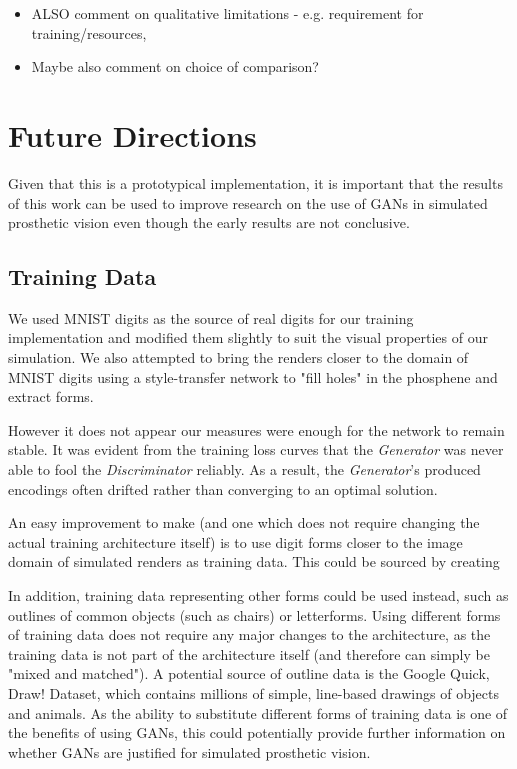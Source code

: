 \documentclass[a4paper,11pt,openany]{book}
\begin{document}
\begin{itemize}
\item ALSO comment on qualitative limitations - e.g. requirement for training/resources,
\item Maybe also comment on choice of comparison?
\end{itemize}

\chapter{Future Directions}
\label{sec:org9806fc4}

Given that this is a prototypical implementation, it is important that the results of this work can be used to improve research on the use of GANs in simulated prosthetic vision even though the early results are not conclusive.

\section*{Training Data}
\label{sec:org60bf5d4}

We used MNIST digits as the source of real digits for our training implementation and modified them slightly to suit the visual properties of our simulation.
We also attempted to bring the renders closer to the domain of MNIST digits using a style-transfer network to "fill holes" in the phosphene and extract forms.

However it does not appear our measures were enough for the network to remain stable.
It was evident from the training loss curves that the \emph{Generator} was never able to fool the \emph{Discriminator} reliably.
As a result, the \emph{Generator}'s produced encodings often drifted rather than converging to an optimal solution.

An easy improvement to make (and one which does not require changing the actual training architecture itself) is to use digit forms closer to the image domain of simulated renders as training data.
This could be sourced by creating

In addition, training data representing other forms could be used instead, such as outlines of common objects (such as chairs) or letterforms.
Using different forms of training data does not require any major changes to the architecture, as the training data is not part of the architecture itself (and therefore can simply be "mixed and matched").
A potential source of outline data is the Google Quick, Draw! Dataset, which contains millions of simple, line-based drawings of objects and animals.
As the ability to substitute different forms of training data is one of the benefits of using GANs, this could potentially provide further information on whether GANs are justified for simulated prosthetic vision.
\end{document}
